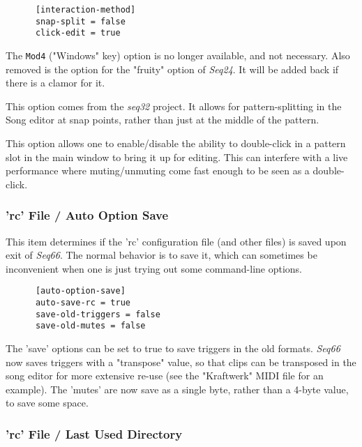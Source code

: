    \begin{verbatim}
      [interaction-method]
      snap-split = false
      click-edit = true
   \end{verbatim}

   The \texttt{Mod4} ("Windows" key) option is no longer available, and not
   necessary.
   Also removed is the option for the "fruity" option of \textsl{Seq24}.
   It will be added back if there is a clamor for it.

   This option comes from the \textsl{seq32} project.  It allows for
   pattern-splitting in the Song editor at snap points, rather than just
   at the middle of the pattern.

   This option allows one to enable/disable the ability to double-click
   in a pattern slot in the main window to bring it up for editing.
   This can interfere with a live performance where muting/unmuting come fast
   enough to be seen as a double-click.

\subsubsection{'rc' File / Auto Option Save}
\label{subsubsec:configuration_rc_auto_option_save}

   This item determines if the 'rc' configuration file (and other files)
   is saved upon exit of \textsl{Seq66}.
   The normal behavior is to save it,
   which can sometimes be inconvenient when one is just trying out some
   command-line options.

   \begin{verbatim}
      [auto-option-save]
      auto-save-rc = true
      save-old-triggers = false
      save-old-mutes = false
   \end{verbatim}

   The 'save' options can be set to true to save triggers in the old formats.
   \textsl{Seq66} now saves triggers with a "transpose" value, so that
   clips can be transposed in the song editor for more extensive re-use
   (see the "Kraftwerk" MIDI file for an example).
   The 'mutes' are now save as a single byte, rather than a 4-byte value, to
   save some space.

\subsubsection{'rc' File / Last Used Directory}
\label{subsubsec:configuration_rc_last_used_dir}

